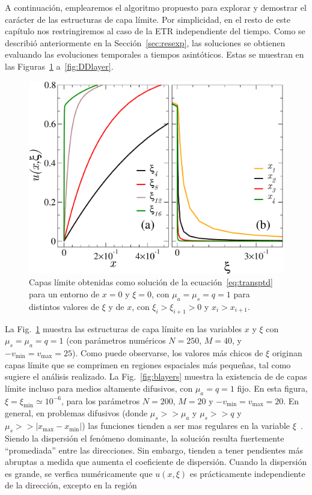 A continuación, emplearemos el algoritmo propuesto para 
explorar y demostrar el carácter de las estructuras de capa límite. 
Por simplicidad, en el resto de este capítulo nos restringiremos 
al caso de la ETR independiente del tiempo. 
Como se describió anteriormente 
en la Sección~\ref{sec:resexp}, las soluciones se obtienen 
evaluando las evoluciones temporales a tiempos asintóticos.
Estas se muestran en las Figuras~\ref{fig:blayers1} 
a~\ref{fig:DDlayer}.
\begin{figure}[h!]
\centering
  \includegraphics[width=0.5\linewidth]{figuras/xilay.pdf}
  \caption{Capas límite obtenidas como solución 
  de la ecuación~\eqref{eq:transptd} para un entorno de $x=0$ y $\xi=0$, 
  con $\mu_a=\mu_s=q=1$ para distintos valores de $\xi$ y de $x$, 
  con $\xi_i>\xi_{i+1}>0$ y $x_i>x_{i+1}$.}
 \label{fig:blayers1}
\end{figure}
La Fig.~\ref{fig:blayers1} muestra las estructuras de capa límite en las 
variables $x$ y $\xi$ con $\mu_s=\mu_a=q=1$ (con parámetros numéricos $N=250$, $M=40$, 
y $-v_{\text{min}}=v_{\text{max}}=25$). Como puede observarse, 
los valores más chicos de $\xi$ 
originan capas límite que se comprimen en regiones espaciales más 
pequeñas, tal como sugiere el análisis realizado. 
La Fig.~\ref{fig:blayers} muestra la existencia de 
de capas límite incluso para medios altamente difusivos, con 
$\mu_a=q=1$ fijo. En esta figura, 
$\xi=\xi_{\text{min}}\simeq 10^{-6}$, para los parámetros 
$N=200$, $M=20$ y $-v_{\text{min}}=v_{\text{max}}=20$. 
En general, en problemas difusivos 
(donde $\mu_s>>\mu_a$ y $\mu_s>>q$ y $\mu_s>>|x_{\text{max}}-x_{\text{min}}|$) 
las funciones tienden a ser mas regulares en la variable $\xi$~\cite{Larsen1987}. 
Siendo la dispersión el fenómeno dominante, 
la solución resulta fuertemente ``promediada'' entre las direcciones.  
Sin embargo, tienden a tener pendientes más abruptas 
a medida que aumenta el coeficiente de dispersión. Cuando la dispersión es grande, 
se verfica numéricamente que 
 $u(x,\xi)$ es prácticamente independiente de la dirección, excepto en la región 
